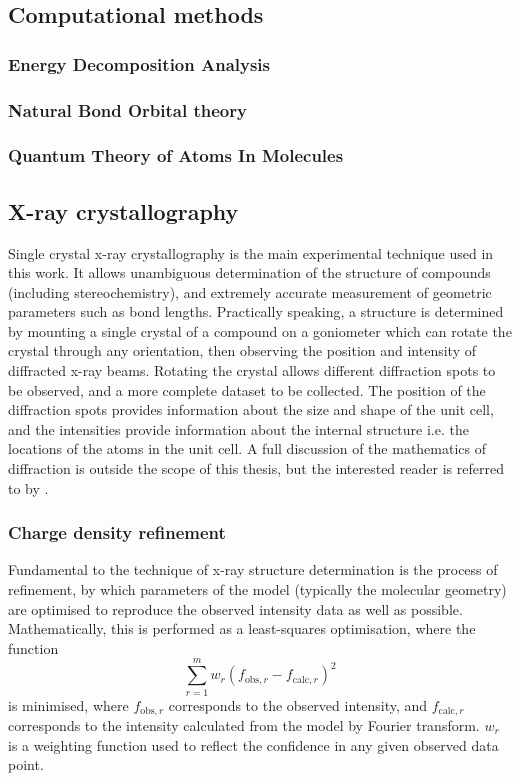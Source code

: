 \begin{refsection}
\subsection{Computational methods}

\subsubsection{Energy Decomposition Analysis}

\subsubsection{Natural Bond Orbital theory}

\subsubsection{Quantum Theory of Atoms In Molecules}

\subsection{X-ray crystallography}
Single crystal x-ray crystallography is the main experimental technique used in this work.
It allows unambiguous determination of the structure of compounds (including stereochemistry), and  extremely accurate measurement of geometric parameters such as bond lengths.
Practically speaking, a structure is determined by mounting a single crystal of a compound on a goniometer which can rotate the crystal through any orientation, then observing the position and intensity of diffracted x-ray beams.
Rotating the crystal allows different diffraction spots to be observed, and a more complete dataset to be collected.
The position of the diffraction spots provides information about the size and shape of the unit cell, and the intensities provide information about the internal structure i.e. the locations of the atoms in the unit cell.
A full discussion of the mathematics of diffraction is outside the scope of this thesis, but the interested reader is referred to  by \citeauthor{Stout1989}.\autocite{Stout1989}

\subsubsection{Charge density refinement}
Fundamental to the technique of x-ray structure determination is the process of refinement, by which parameters of the model (typically the molecular geometry) are optimised to reproduce the observed intensity data as well as possible.
Mathematically, this is performed as a least-squares optimisation, where the function
\begin{equation}
    \sum^{m}_{r=1} w_{r} \left(f_{\mathrm{obs}, r} - f_{\mathrm{calc}, r} \right) ^{2}
\end{equation}
is minimised, where $f_{\mathrm{obs}, r}$ corresponds to the observed intensity, and $f_{\mathrm{calc}, r}$ corresponds to the intensity calculated from the model by Fourier transform.
$w_{r}$ is a weighting function used to reflect the confidence in any given observed data point.


\end{refsection}
